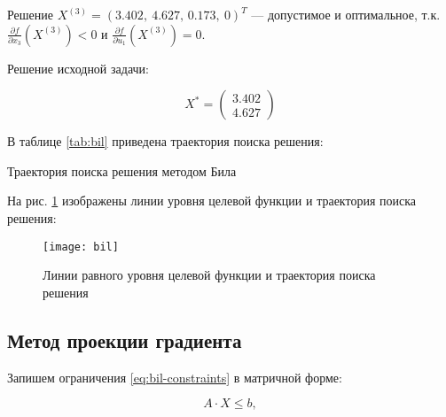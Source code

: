 Решение $X^{(3)} = (3.402,\ 4.627,\, 0.173,\ 0)^T$ --- допустимое и оптимальное, т.к. $\frac{\partial f}{\partial x_3} (X^{(3)}) < 0$ и  $\frac{\partial f}{\partial u_1} (X^{(3)}) = 0$.

Решение исходной задачи:

\begin{equation*}
	X^{*} = \begin{pmatrix}
		3.402 \\ 4.627
	\end{pmatrix}
\end{equation*}

В таблице \ref{tab:bil} приведена траектория поиска решения:

\begin{table}[H]
\begin{center}
	\caption{Траектория поиска решения методом Била}
	\label{tab:bil}
	\def\tabcolsep{18pt}
	\def\arraystretch{1.5}
	\fontsize{13}{14}\selectfont
\end{center}
\end{table}

На рис. \ref{pic:bil} изображены линии уровня целевой функции и траектория поиска решения:

\begin{figure}[H]
\begin{center}
	\texttt{[image: bil]}
	\caption{Линии равного уровня целевой функции и траектория поиска решения}
	\label{pic:bil}
\end{center}
\end{figure}

\subsection{Метод проекции градиента}

Запишем ограничения \ref{eq:bil-constraints} в матричной форме:

\begin{equation*}
	A \cdot X \leq b, 
\end{equation*}

